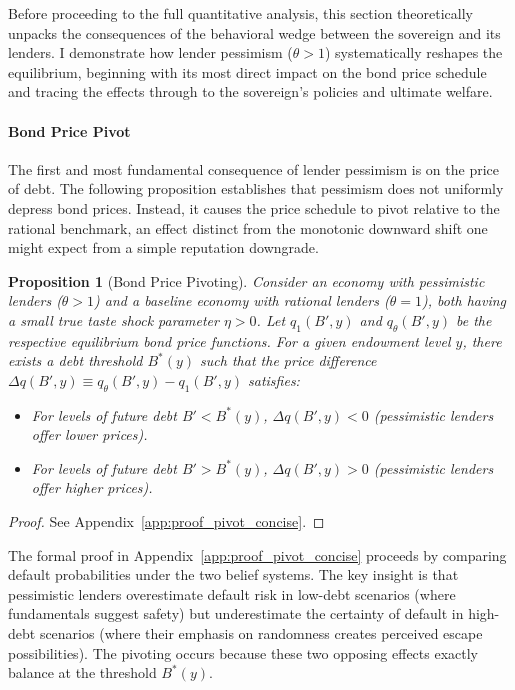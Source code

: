 \documentclass[12pt]{article}
\theoremstyle{plain}
\newtheorem{proposition}{Proposition}
\begin{document}
Before proceeding to the full quantitative analysis, this section theoretically
unpacks the consequences of the behavioral wedge between the sovereign and its
lenders. I demonstrate how lender pessimism ($\theta > 1$) systematically
reshapes the equilibrium, beginning with its most direct impact on the bond
price schedule and tracing the effects through to the sovereign's policies and
ultimate welfare.

\paragraph{Bond Price Pivot}The first and most fundamental consequence of lender pessimism is on the price
of debt. The following proposition establishes that pessimism does not
uniformly depress bond prices. Instead, it causes the price schedule to pivot
relative to the rational benchmark, an effect distinct from the monotonic
downward shift one might expect from a simple reputation downgrade.

\begin{proposition}[Bond Price Pivoting]\label{prop:pivot_concise}
	Consider an economy with pessimistic lenders ($\theta > 1$) and a baseline economy with rational lenders ($\theta = 1$), both having a small true taste shock parameter $\eta > 0$. Let $q_1(B', y)$ and $q_\theta(B', y)$ be the respective equilibrium bond price functions. For a given endowment level $y$, there exists a debt threshold $B^*(y)$ such that the price difference $\Delta q(B', y) \equiv q_\theta(B', y) - q_1(B', y)$ satisfies:
	\begin{itemize}
		\item For levels of future debt $B' < B^*(y)$, $\Delta q(B', y) < 0$ (pessimistic
		      lenders offer lower prices).
		\item For levels of future debt $B' > B^*(y)$, $\Delta q(B', y) > 0$ (pessimistic
		      lenders offer higher prices).
	\end{itemize}
\end{proposition}

\begin{proof}
	See Appendix~\ref{app:proof_pivot_concise}.
\end{proof}

The formal proof in Appendix~\ref{app:proof_pivot_concise} proceeds by
comparing default probabilities under the two belief systems. The key insight
is that pessimistic lenders overestimate default risk in low-debt scenarios
(where fundamentals suggest safety) but underestimate the certainty of default
in high-debt scenarios (where their emphasis on randomness creates perceived
escape possibilities). The pivoting occurs because these two opposing effects
exactly balance at the threshold $B^*(y)$.
\end{document}
